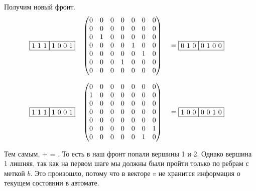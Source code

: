 \begin{example}
  Получим новый фронт.
  \begin{alignat*}{7}
    & \begin{matrix}
      \fbox{1 1 1} \fbox{1 0 0 1}
      \end{matrix}  && \begin{pmatrix}
        0 & 0 & 0 & 0 & 0 & 0 & 0 \\
        0 & 0 & 0 & 0 & 0 & 0 & 0 \\
        0 & 1 & 0 & 0 & 0 & 0 & 0 \\
        0 & 0 & 0 & 0 & 1 & 0 & 0 \\
        0 & 0 & 0 & 0 & 0 & 1 & 0 \\
        0 & 0 & 0 & 1 & 0 & 0 & 0 \\
        0 & 0 & 0 & 0 & 0 & 0 & 0 
        \end{pmatrix} &&= \begin{matrix}
          \fbox{0 1 0} \fbox{0 1 0 0} 
          \end{matrix}
    \end{alignat*}

  \begin{alignat*}{7}
    & \begin{matrix}
      \fbox{1 1 1} \fbox{1 0 0 1}
      \end{matrix}  && \begin{pmatrix}
        0 & 0 & 0 & 0 & 0 & 0 & 0 \\
        1 & 0 & 0 & 0 & 0 & 0 & 0 \\
        0 & 0 & 0 & 0 & 0 & 0 & 0 \\
        0 & 0 & 0 & 0 & 0 & 0 & 0 \\
        0 & 0 & 0 & 0 & 0 & 0 & 0 \\
        0 & 0 & 0 & 0 & 0 & 0 & 1 \\
        0 & 0 & 0 & 0 & 0 & 1 & 0 
        \end{pmatrix} &&= \begin{matrix}
          \fbox{1 0 0} \fbox{0 0 1 0}
          \end{matrix}
    \end{alignat*}

    Тем самым,   +   =  . То есть в наш фронт  попали вершины 1 и 2.
    Однако вершина 1 лишняя, так как на первом шаге мы должны были пройти только по ребрам с меткой $b$. Это произошло, потому что в векторе $v$ не хранится информация о текущем состоянии в автомате.


\end{example}
